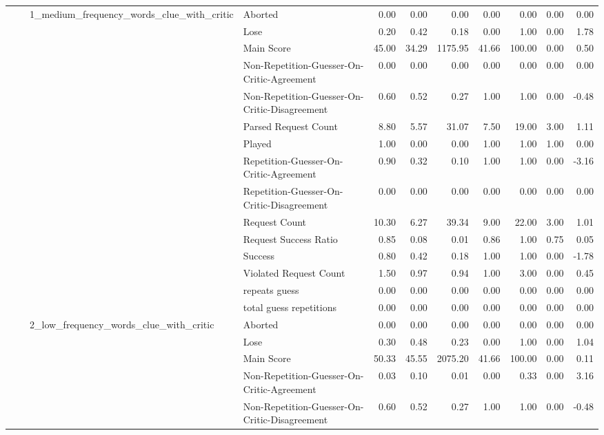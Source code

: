 \begin{tabular}{llllrrrrrrr}
\cline{3-11}
 &  & \multirow[t]{15}{*}{1_medium_frequency_words_clue_with_critic} & Aborted & 0.00 & 0.00 & 0.00 & 0.00 & 0.00 & 0.00 & 0.00 \\
 &  &  & Lose & 0.20 & 0.42 & 0.18 & 0.00 & 1.00 & 0.00 & 1.78 \\
 &  &  & Main Score & 45.00 & 34.29 & 1175.95 & 41.66 & 100.00 & 0.00 & 0.50 \\
 &  &  & Non-Repetition-Guesser-On-Critic-Agreement & 0.00 & 0.00 & 0.00 & 0.00 & 0.00 & 0.00 & 0.00 \\
 &  &  & Non-Repetition-Guesser-On-Critic-Disagreement & 0.60 & 0.52 & 0.27 & 1.00 & 1.00 & 0.00 & -0.48 \\
 &  &  & Parsed Request Count & 8.80 & 5.57 & 31.07 & 7.50 & 19.00 & 3.00 & 1.11 \\
 &  &  & Played & 1.00 & 0.00 & 0.00 & 1.00 & 1.00 & 1.00 & 0.00 \\
 &  &  & Repetition-Guesser-On-Critic-Agreement & 0.90 & 0.32 & 0.10 & 1.00 & 1.00 & 0.00 & -3.16 \\
 &  &  & Repetition-Guesser-On-Critic-Disagreement & 0.00 & 0.00 & 0.00 & 0.00 & 0.00 & 0.00 & 0.00 \\
 &  &  & Request Count & 10.30 & 6.27 & 39.34 & 9.00 & 22.00 & 3.00 & 1.01 \\
 &  &  & Request Success Ratio & 0.85 & 0.08 & 0.01 & 0.86 & 1.00 & 0.75 & 0.05 \\
 &  &  & Success & 0.80 & 0.42 & 0.18 & 1.00 & 1.00 & 0.00 & -1.78 \\
 &  &  & Violated Request Count & 1.50 & 0.97 & 0.94 & 1.00 & 3.00 & 0.00 & 0.45 \\
 &  &  & repeats guess & 0.00 & 0.00 & 0.00 & 0.00 & 0.00 & 0.00 & 0.00 \\
 &  &  & total guess repetitions & 0.00 & 0.00 & 0.00 & 0.00 & 0.00 & 0.00 & 0.00 \\
\cline{3-11}
 &  & \multirow[t]{15}{*}{2_low_frequency_words_clue_with_critic} & Aborted & 0.00 & 0.00 & 0.00 & 0.00 & 0.00 & 0.00 & 0.00 \\
 &  &  & Lose & 0.30 & 0.48 & 0.23 & 0.00 & 1.00 & 0.00 & 1.04 \\
 &  &  & Main Score & 50.33 & 45.55 & 2075.20 & 41.66 & 100.00 & 0.00 & 0.11 \\
 &  &  & Non-Repetition-Guesser-On-Critic-Agreement & 0.03 & 0.10 & 0.01 & 0.00 & 0.33 & 0.00 & 3.16 \\
 &  &  & Non-Repetition-Guesser-On-Critic-Disagreement & 0.60 & 0.52 & 0.27 & 1.00 & 1.00 & 0.00 & -0.48 \\

\end{tabular}
